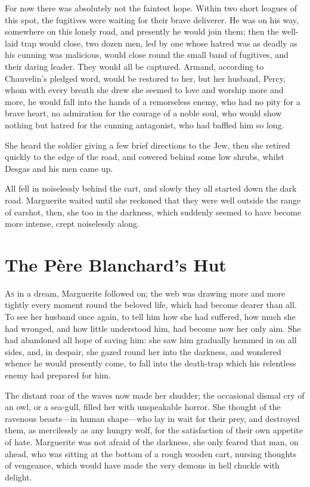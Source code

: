 \documentclass[paper=a5,BCOR=7mm,twoside,DIV=calc,12pt,usegeometry,chapterprefix,endperiod,headings=big]{scrbook}
\begin{document}
For now there was absolutely not the faintest hope. Within two short leagues of this spot, the fugitives were waiting for their brave deliverer. He was on his way, somewhere on this lonely road, and presently he would join them; then the well-laid trap would close, two dozen men, led by one whose hatred was as deadly as his cunning was malicious, would close round the small band of fugitives, and their daring leader. They would all be captured. Armand, according to Chauvelin's pledged word, would be restored to her, but her husband, Percy, whom with every breath she drew she seemed to love and worship more and more, he would fall into the hands of a remorseless enemy, who had no pity for a brave heart, no admiration for the courage of a noble soul, who would show nothing but hatred for the cunning antagonist, who had baffled him so long.

She heard the soldier giving a few brief directions to the Jew, then she retired quickly to the edge of the road, and cowered behind some low shrubs, whilst Desgas and his men came up.

All fell in noiselessly behind the cart, and slowly they all started down the dark road. Marguerite waited until she reckoned that they were well outside the range of earshot, then, she too in the darkness, which suddenly seemed to have become more intense, crept noiselessly along.

\chapter{The Père Blanchard's Hut}
\lettrine[lines=4]{A}{s} in a dream, Marguerite followed on; the web was drawing more and more tightly every moment round the beloved life, which had become dearer than all. To see her husband once again, to tell him how she had suffered, how much she had wronged, and how little understood him, had become now her only aim. She had abandoned all hope of saving him: she saw him gradually hemmed in on all sides, and, in despair, she gazed round her into the darkness, and wondered whence he would presently come, to fall into the death-trap which his relentless enemy had prepared for him.

The distant roar of the waves now made her shudder; the occasional dismal cry of an owl, or a sea-gull, filled her with unspeakable horror. She thought of the ravenous beasts---in human shape---who lay in wait for their prey, and destroyed them, as mercilessly as any hungry wolf, for the satisfaction of their own appetite of hate. Marguerite was not afraid of the darkness, she only feared that man, on ahead, who was sitting at the bottom of a rough wooden cart, nursing thoughts of vengeance, which would have made the very demons in hell chuckle with delight.
\end{document}
